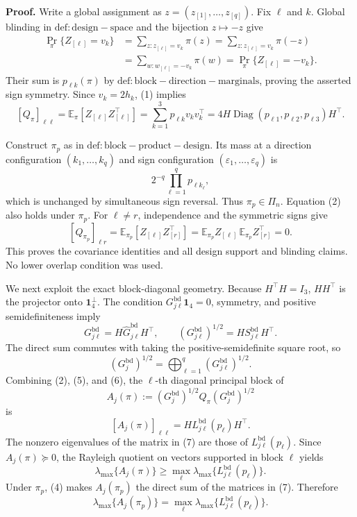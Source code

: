 \textbf{Proof.}
Write a global assignment as \(z=(z_{[1]},\ldots,z_{[q]})\).  Fix \(\ell\) and \(k\).  Global blinding in \(\mathrm{def:design-space}\) and the bijection \(z\mapsto-z\) give
\[
\begin{aligned}
\Pr_\pi\{Z_{[\ell]}=v_k\}
&=\sum_{z:z_{[\ell]}=v_k}\pi(z)
=\sum_{z:z_{[\ell]}=v_k}\pi(-z)\\
&=\sum_{w:w_{[\ell]}=-v_k}\pi(w)
=\Pr_\pi\{Z_{[\ell]}=-v_k\}.
\end{aligned}
\tag{1}
\]
Their sum is \(p_{\ell k}(\pi)\) by \(\mathrm{def:block-direction-marginals}\), proving the asserted sign symmetry.  Since \(v_k=2h_k\), (1) implies
\[
[Q_\pi]_{\ell\ell}
=\mathbb E_\pi[Z_{[\ell]}Z_{[\ell]}^\top]
=\sum_{k=1}^3p_{\ell k}v_kv_k^\top
=4H\operatorname{Diag}(p_{\ell1},p_{\ell2},p_{\ell3})H^\top.
\tag{2}
\]

Construct \(\pi_p\) as in \(\mathrm{def:block-product-design}\).  Its mass at a direction configuration \((k_1,\ldots,k_q)\) and sign configuration \((\varepsilon_1,\ldots,\varepsilon_q)\) is
\[
2^{-q}\prod_{\ell=1}^qp_{\ell k_\ell},
\tag{3}
\]
which is unchanged by simultaneous sign reversal. Thus \(\pi_p\in\Pi_n\).  Equation (2) also holds under \(\pi_p\).  For \(\ell\ne r\), independence and the symmetric signs give
\[
[Q_{\pi_p}]_{\ell r}
=\mathbb E_{\pi_p}[Z_{[\ell]}Z_{[r]}^\top]
=\mathbb E_{\pi_p}Z_{[\ell]}\,\mathbb E_{\pi_p}Z_{[r]}^\top=0.
\tag{4}
\]
This proves the covariance identities and all design support and blinding claims.  No lower overlap condition was used.

We next exploit the exact block-diagonal geometry.  Because \(H^\top H=I_3\), \(HH^\top\) is the projector onto \(\mathbf 1_4^\perp\).  The condition \(G^{\mathrm{bd}}_{j\ell}\mathbf 1_4=0\), symmetry, and positive semidefiniteness imply
\[
G^{\mathrm{bd}}_{j\ell}
=H\widehat G^{\mathrm{bd}}_{j\ell}H^\top,
\qquad
(G^{\mathrm{bd}}_{j\ell})^{1/2}
=HS^{\mathrm{bd}}_{j\ell}H^\top.
\tag{5}
\]
The direct sum commutes with taking the positive-semidefinite square root, so
\[
(G_j^{\mathrm{bd}})^{1/2}
=\bigoplus_{\ell=1}^q(G^{\mathrm{bd}}_{j\ell})^{1/2}.
\tag{6}
\]
Combining (2), (5), and (6), the \(\ell\)-th diagonal principal block of
\[
A_j(\pi):=(G_j^{\mathrm{bd}})^{1/2}Q_\pi(G_j^{\mathrm{bd}})^{1/2}
\]
is
\[
[A_j(\pi)]_{\ell\ell}
=H L^{\mathrm{bd}}_{j\ell}(p_\ell)H^\top.
\tag{7}
\]
The nonzero eigenvalues of the matrix in (7) are those of \(L^{\mathrm{bd}}_{j\ell}(p_\ell)\).  Since \(A_j(\pi)\succeq0\), the Rayleigh quotient on vectors supported in block \(\ell\) yields
\[
\lambda_{\max}\{A_j(\pi)\}
\ge\max_\ell\lambda_{\max}\{L^{\mathrm{bd}}_{j\ell}(p_\ell)\}.
\tag{8}
\]
Under \(\pi_p\), (4) makes \(A_j(\pi_p)\) the direct sum of the matrices in (7). Therefore
\[
\lambda_{\max}\{A_j(\pi_p)\}
=\max_\ell\lambda_{\max}\{L^{\mathrm{bd}}_{j\ell}(p_\ell)\}.
\tag{9}
\]

